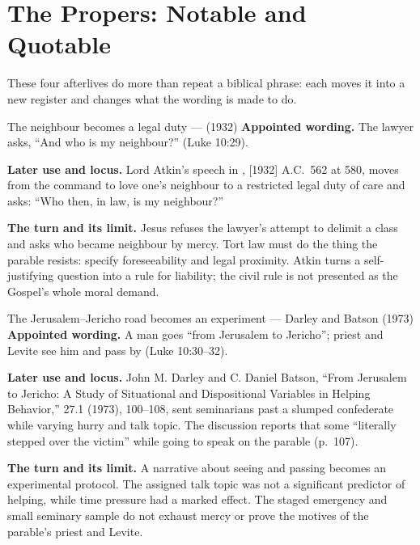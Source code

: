 \sectionguard
\section*{The Propers: Notable and Quotable}

These four afterlives do more than repeat a biblical phrase: each moves it into
a new register and changes what the wording is made to do.

\begin{afterlife}{The neighbour becomes a legal duty ---  (1932)}
\textbf{Appointed wording.} The lawyer asks, ``And who is my neighbour?''
(Luke 10:29).

\textbf{Later use and locus.} Lord Atkin's speech in , [1932] A.C.~562 at 580, moves from the command to love one's
neighbour to a restricted legal duty of care and asks: ``Who then, in law, is
my neighbour?''

\textbf{The turn and its limit.} Jesus refuses the lawyer's attempt to delimit
a class and asks who became neighbour by mercy. Tort law must do the thing the
parable resists: specify foreseeability and legal proximity. Atkin turns a
self-justifying question into a rule for liability; the civil rule is
not presented as the Gospel's whole moral demand.
\end{afterlife}

\begin{afterlife}{The Jerusalem--Jericho road becomes an experiment --- Darley and Batson (1973)}
\textbf{Appointed wording.} A man goes ``from Jerusalem to Jericho''; priest
and Levite see him and pass by (Luke 10:30--32).

\textbf{Later use and locus.} John M. Darley and C. Daniel Batson, ``From
Jerusalem to Jericho: A Study of Situational and Dispositional Variables in
Helping Behavior,''  27.1
(1973), 100--108, sent seminarians past a slumped confederate while varying
hurry and talk topic. The discussion reports that some ``literally stepped
over the victim'' while going to speak on the parable (p.~107).

\textbf{The turn and its limit.} A narrative about seeing and passing becomes
an experimental protocol. The assigned talk topic was not a significant
predictor of helping, while time pressure had a marked effect. The staged
emergency and small seminary sample do
not exhaust mercy or prove the motives of the parable's priest and Levite.
\end{afterlife}

